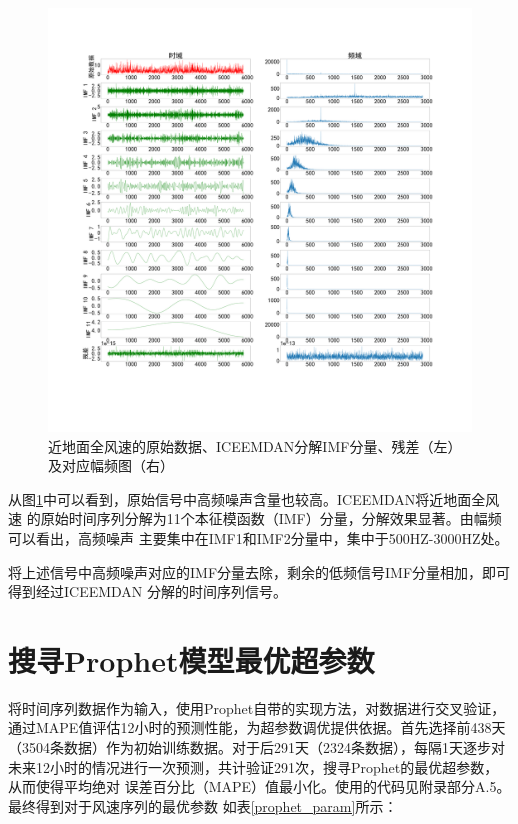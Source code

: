 \documentclass[AutoFakeBold]{LZUThesis}
\begin{document}
\begin{figure}[H]
    \centering
    \includegraphics[width=1\textwidth]{figures/wind.pdf}
    \caption{近地面全风速的原始数据、ICEEMDAN分解IMF分量、残差（左）及对应幅频图（右）}
    \label{fig_wind}
\end{figure}

从图\ref{fig_wind}中可以看到，原始信号中高频噪声含量也较高。ICEEMDAN将近地面全风速
的原始时间序列分解为11个本征模函数（IMF）分量，分解效果显著。由幅频可以看出，高频噪声
主要集中在IMF1和IMF2分量中，集中于500HZ-3000HZ处。

将上述信号中高频噪声对应的IMF分量去除，剩余的低频信号IMF分量相加，即可得到经过ICEEMDAN
分解的时间序列信号。

\section{搜寻Prophet模型最优超参数}
将时间序列数据作为输入，使用Prophet自带的实现方法，对数据进行交叉验证，
通过MAPE值评估12小时的预测性能，为超参数调优提供依据。首先选择前438天
（3504条数据）作为初始训练数据。对于后291天（2324条数据），每隔1天逐步对
未来12小时的情况进行一次预测，共计验证291次，搜寻Prophet的最优超参数，从而使得平均绝对
误差百分比（MAPE）值最小化。使用的代码见附录部分A.5。最终得到对于风速序列的最优参数
如表\ref{prophet_param}所示：
\end{document}
